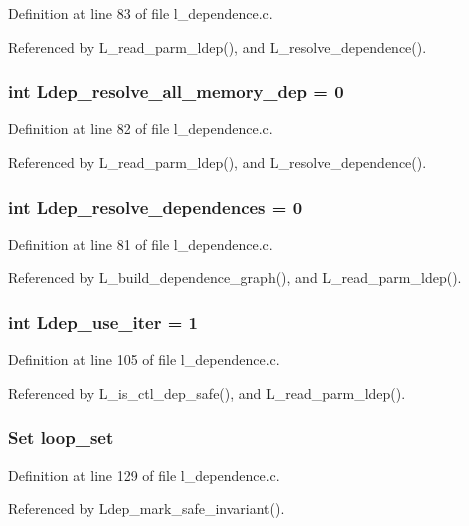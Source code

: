 Definition at line 83 of file l\_\-dependence.c.

Referenced by L\_\-read\_\-parm\_\-ldep(), and L\_\-resolve\_\-dependence().
\subsubsection{\setlength{\rightskip}{0pt plus 5cm}int \bf{Ldep\_\-resolve\_\-all\_\-memory\_\-dep} = 0}\label{l__dependence_8c_c42d1d5d56602a5bbcfb1daa875a0565}




Definition at line 82 of file l\_\-dependence.c.

Referenced by L\_\-read\_\-parm\_\-ldep(), and L\_\-resolve\_\-dependence().
\subsubsection{\setlength{\rightskip}{0pt plus 5cm}int \bf{Ldep\_\-resolve\_\-dependences} = 0}\label{l__dependence_8c_0faf9114a6f87ede074d803d6291fb63}




Definition at line 81 of file l\_\-dependence.c.

Referenced by L\_\-build\_\-dependence\_\-graph(), and L\_\-read\_\-parm\_\-ldep().
\subsubsection{\setlength{\rightskip}{0pt plus 5cm}int \bf{Ldep\_\-use\_\-iter} = 1}\label{l__dependence_8c_0fe7e26f84bc9e8c1660eb6e3216c040}




Definition at line 105 of file l\_\-dependence.c.

Referenced by L\_\-is\_\-ctl\_\-dep\_\-safe(), and L\_\-read\_\-parm\_\-ldep().
\subsubsection{\setlength{\rightskip}{0pt plus 5cm}\bf{Set} \bf{loop\_\-set}\hspace{0.3cm}{\tt  [static]}}\label{l__dependence_8c_8f93e9bc2600170bf600510cf9fc0a2f}




Definition at line 129 of file l\_\-dependence.c.

Referenced by Ldep\_\-mark\_\-safe\_\-invariant().